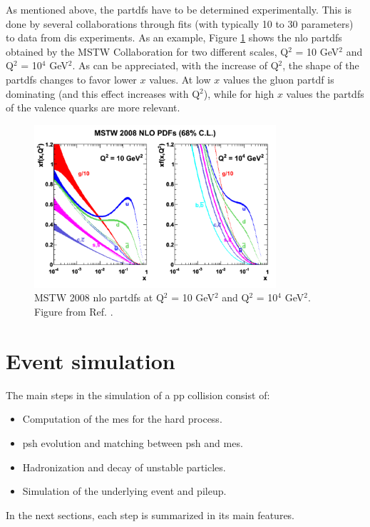 As mentioned above, the \glspl{partdf} have to be determined experimentally. This is done by several collaborations through fits (with typically 10 to 30 parameters) to data from \gls{dis} experiments. As an example, Figure \ref{fig:sim:pp} shows the \gls{nlo} \glspl{partdf} obtained by the MSTW Collaboration for two different scales, Q$^2$ = 10 GeV$^2$ and Q$^2$ = 10$^4$ GeV$^2$. As can be appreciated, with the increase of Q$^2$, the shape of the \glspl{partdf} changes to favor lower $x$ values. At low $x$ values the gluon \gls{partdf} is dominating (and this effect increases with Q$^2$), while for high $x$ values the \glspl{partdf} of the valence quarks are more relevant.

\begin{figure}[h]
\begin{center}
    \includegraphics[width=0.8\textwidth]{figures/simul/pdf}
\end{center}
\caption{MSTW 2008 \gls{nlo} \glspl{partdf} at Q$^2$ = 10 GeV$^2$ and Q$^2$ = 10$^4$ GeV$^2$. Figure from Ref. \cite{Martin:2009iq}.}
 \label{fig:sim:pp}
\end{figure}


\section{Event simulation}
\label{sec:eventsimul}

The main steps in the simulation of a \gls{pp} collision consist of:
\begin{itemize}
\item Computation of the \glspl{me} for the hard process.
\item \Gls{psh} evolution and matching between \gls{psh} and \glspl{me}.
\item Hadronization and decay of unstable particles.
\item Simulation of the underlying event and pileup.
\end{itemize}
In the next sections, each step is summarized in its main features.

